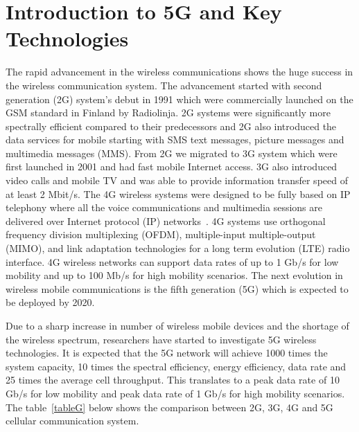 \chapter{Introduction to 5G and Key Technologies}
\label{chapter2}
The rapid advancement in the wireless communications shows the huge success in the wireless communication system. The advancement started with second generation (2G) system's debut in 1991 which were commercially launched on the GSM standard in Finland by Radiolinja. 2G systems were significantly more spectrally efficient compared to their predecessors and 2G also introduced the data services for mobile starting with SMS text messages, picture messages and multimedia messages (MMS). From 2G we migrated to 3G system which were first launched in 2001 and had fast mobile Internet access. 3G also introduced video calls and mobile TV and was able to provide information transfer speed of at least 2 Mbit/s. The 4G wireless systems were designed to be fully based on IP telephony where all the voice communications and multimedia sessions are delivered over Internet protocol (IP) networks~\cite{4561570}. 4G systems use orthogonal frequency division multiplexing (OFDM), multiple-input multiple-output (MIMO), and link adaptation technologies for a long term evolution (LTE) radio interface. 4G wireless networks can support data rates of up to 1 Gb/s for low mobility and up to 100 Mb/s for high mobility scenarios. The next evolution in wireless mobile communications is the fifth generation (5G) which is expected to be deployed by 2020.

Due to a sharp increase in number of wireless mobile devices and the shortage of the wireless spectrum, researchers have started to investigate 5G wireless technologies. It is expected that the 5G network will achieve 1000 times the system capacity, 10 times the spectral efficiency, energy efficiency, data rate and 25 times the average cell throughput. This translates to a peak data rate of 10 Gb/s for low mobility and peak data rate of 1 Gb/s for high mobility scenarios. The table~\ref{tableG} below shows the comparison between 2G, 3G, 4G and 5G cellular communication system. 

\begin{table}[!ht]
\centering
\label{tableG}
\caption{Cellular Technologies Comparison between different generations of deployed digital cellular networks. Data rates, standard and implementation technology is compared for the 3G, 4G and 5G}
\end{table}


